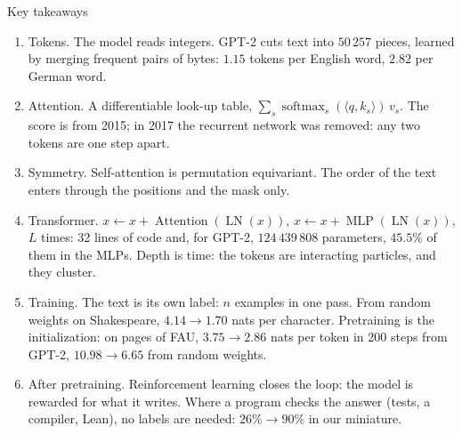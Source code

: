 \documentclass[10pt]{beamer}
\DeclareMathOperator{\softmax}{softmax}
\DeclareMathOperator{\Attention}{Attention}
\DeclareMathOperator{\MLP}{MLP}
\DeclareMathOperator{\LN}{LN}
\begin{document}
\begin{frame}{Key takeaways}
\footnotesize
\begin{enumerate}
\item \alert{Tokens.} The model reads integers. GPT-2 cuts text into $50\,257$ pieces, learned by merging frequent pairs of bytes: $1.15$ tokens per English word, $2.82$ per German word.
\item \alert{Attention.} A differentiable look-up table, $\sum_s\softmax_s(\langle q,k_s\rangle)\,v_s$. The score is from 2015; in 2017 the recurrent network was removed: any two tokens are one step apart.
\item \alert{Symmetry.} Self-attention is permutation equivariant. The order of the text enters through the positions and the mask only.
\item \alert{Transformer.} $x\leftarrow x+\Attention(\LN(x))$, $x\leftarrow x+\MLP(\LN(x))$, $L$ times: 32 lines of code and, for GPT-2, $124\,439\,808$ parameters, $45.5\%$ of them in the MLPs. Depth is time: the tokens are interacting particles, and they cluster.
\item \alert{Training.} The text is its own label: $n$ examples in one pass. From random weights on Shakespeare, $4.14\to1.70$ nats per character. Pretraining is the initialization: on pages of FAU, $3.75\to2.86$ nats per token in 200 steps from GPT-2, $10.98\to6.65$ from random weights.
\item \alert{After pretraining.} Reinforcement learning closes the loop: the model is rewarded for what it writes. Where a program checks the answer (tests, a compiler, Lean), no labels are needed: $26\%\to90\%$ in our miniature.
\end{enumerate}
\end{frame}



\appendix
{}
\end{document}
